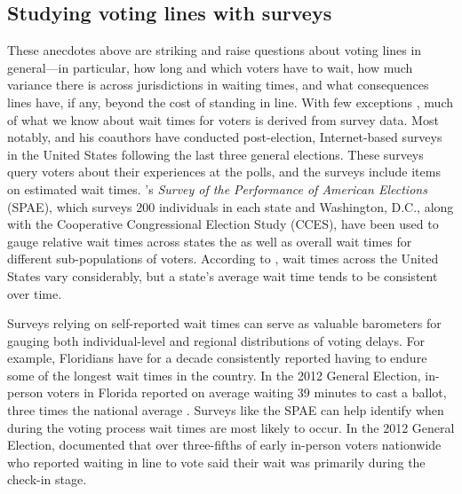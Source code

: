 \documentclass[12pt,titlepage]{article}
\begin{document}
\subsection*{Studying voting lines with surveys}

These anecdotes above are striking and raise questions about voting
lines in general---in particular, how long and which voters have to
wait, how much variance there is across jurisdictions in waiting
times, and what consequences lines have, if any, beyond the cost of
standing in line.  With few exceptions
\citep[e.g.,][]{spencermarkovits:renege, herronsmith:hanoverstudy,
  pettigrew:longlinesminorityprecincts}, much of what we know about
wait times for voters is derived from survey data. Most notably,
\citet{stewart:waitingtovote2012} and his coauthors have conducted
post-election, Internet-based surveys in the United States following
the last three general elections.  These surveys query voters about
their experiences at the polls, and the surveys include items on
estimated wait times.  \citeauthor{stewart:waitingtovote2012}'s
\emph{Survey of the Performance of American Elections} (SPAE), which
surveys 200 individuals in each state and Washington, D.C., along with
the Cooperative Congressional Election Study (CCES), have been used to
gauge relative wait times across states the as well as overall wait
times for different sub-populations of voters.  According to
\citeauthor{stewart:waitingtovote2012}, wait times across the United
States vary considerably, but a state's average wait time tends to be
consistent over time.

Surveys relying on self-reported wait times can serve as valuable
barometers for gauging both individual-level and regional
distributions of voting delays.  For example, Floridians have for a
decade consistently reported having to endure some of the longest wait
times in the country. In the 2012 General Election, in-person voters
in Florida reported on average waiting 39 minutes to cast a ballot,
three times the national average \citep{stewart:waitingtovote2012}.
Surveys like the SPAE can help identify when during the voting process
wait times are most likely to occur.  In the 2012 General Election,
\citeauthor{stewart:waitingtovote2012} documented that over
three-fifths of early in-person voters nationwide who reported waiting
in line to vote said their wait was primarily during the check-in
stage.
\end{document}
